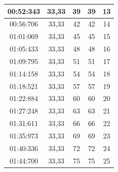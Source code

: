\documentclass[12pt,a4paper,twoside]{book}
\begin{document}
\begin{table}[H]
{\begin{tabular}{|c|c|c|c|c|}
            00:52:343      & 33,33                          & 39                            & 39                          & 13                          \\ \hline
            00:56:706      & 33,33                          & 42                            & 42                          & 14                          \\ \hline
            01:01:069      & 33,33                          & 45                            & 45                          & 15                          \\ \hline
            01:05:433      & 33,33                          & 48                            & 48                          & 16                          \\ \hline
            01:09:795      & 33,33                          & 51                            & 51                          & 17                          \\ \hline
            01:14:158      & 33,33                          & 54                            & 54                          & 18                          \\ \hline
            01:18:521      & 33,33                          & 57                            & 57                          & 19                          \\ \hline
            01:22:884      & 33,33                          & 60                            & 60                          & 20                          \\ \hline
            01:27:248      & 33,33                          & 63                            & 63                          & 21                          \\ \hline
            01:31:611      & 33,33                          & 66                            & 66                          & 22                          \\ \hline
            01:35:973      & 33,33                          & 69                            & 69                          & 23                          \\ \hline
            01:40:336      & 33,33                          & 72                            & 72                          & 24                          \\ \hline
            01:44:700      & 33,33                          & 75                            & 75                          & 25                          \\ \hline

\end{tabular}}
\end{table}
\end{document}
